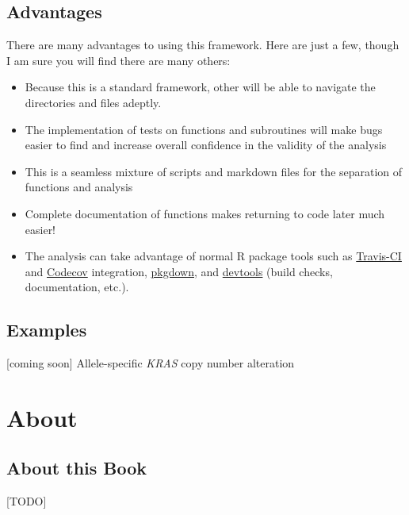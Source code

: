 \documentclass[]{book}
\providecommand{\tightlist}{%
  \setlength{\itemsep}{0pt}\setlength{\parskip}{0pt}}
\begin{document}
\subsection*{Advantages}\label{advantages}

There are many advantages to using this framework. Here are just a few,
though I am sure you will find there are many others:

\begin{itemize}
\tightlist
\item
  Because this is a standard framework, other will be able to navigate
  the directories and files adeptly.
\item
  The implementation of tests on functions and subroutines will make
  bugs easier to find and increase overall confidence in the validity of
  the analysis
\item
  This is a seamless mixture of scripts and markdown files for the
  separation of functions and analysis
\item
  Complete documentation of functions makes returning to code later much
  easier!
\item
  The analysis can take advantage of normal R package tools such as
  \href{https://travis-ci.org}{Travis-CI} and
  \href{https://codecov.io}{Codecov} integration,
  \href{https://pkgdown.r-lib.org}{pkgdown}, and
  \href{https://devtools.r-lib.org}{devtools} (build checks,
  documentation, etc.).
\end{itemize}

\subsection*{Examples}\label{examples}

{[}coming soon{]} Allele-specific \emph{KRAS} copy number alteration

\section*{About}\label{about}

\subsection*{About this Book}\label{about-this-book}

{[}TODO{]}
\end{document}
